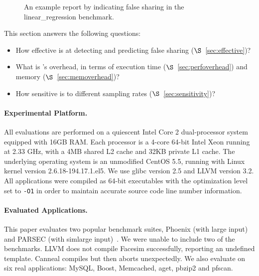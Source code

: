 \begin{figure}[htb]
{\centering
\tiny
\subfigure{}
\caption{An example report by \Predator{} indicating false sharing in the linear\_regression benchmark.
\label{fig:lrreport}}
}
\end{figure}



\label{sec:evaluation}

This section answers the following questions:
\begin{itemize}
\item
  How effective is \Predator{} at detecting and predicting false sharing ($\S$~\ref{sec:effective})?

\item
  What is \Predator{}'s overhead, in terms of execution time ($\S$~\ref{sec:perfoverhead}) and memory ($\S$~\ref{sec:memoverhead})?

\item 
  How sensitive is \Predator{} to different sampling rates ($\S$~\ref{sec:sensitivity})? 
 
\end{itemize}


\paragraph{Experimental Platform.} All evaluations are performed on a quiescent Intel Core 2 dual-processor system equipped with 
16GB RAM. Each processor is a 4-core 64-bit Intel Xeon running at 2.33 GHz, with a 4MB shared L2 cache and 32KB private L1 cache. The underlying operating system is an unmodified CentOS 5.5, running with Linux kernel version 2.6.18-194.17.1.el5. We use glibc version 2.5 and LLVM version 3.2. 
All applications were compiled as 64-bit executables with the optimization level set to \texttt{-O1} in order to maintain accurate source code line number information.

\paragraph{Evaluated Applications.} 
This paper evaluates two popular benchmark suites,
Phoenix (with large input)~\cite{phoenix-hpca} and PARSEC (with simlarge input)~\cite{parsec}. We were unable to include two of the benchmarks. LLVM does not compile Facesim successfully, reporting an undefined template. Canneal compiles but then aborts unexpectedly. We also evaluate \Predator{} on six real applications: MySQL, Boost, Memcached, aget, pbzip2 and pfscan.



